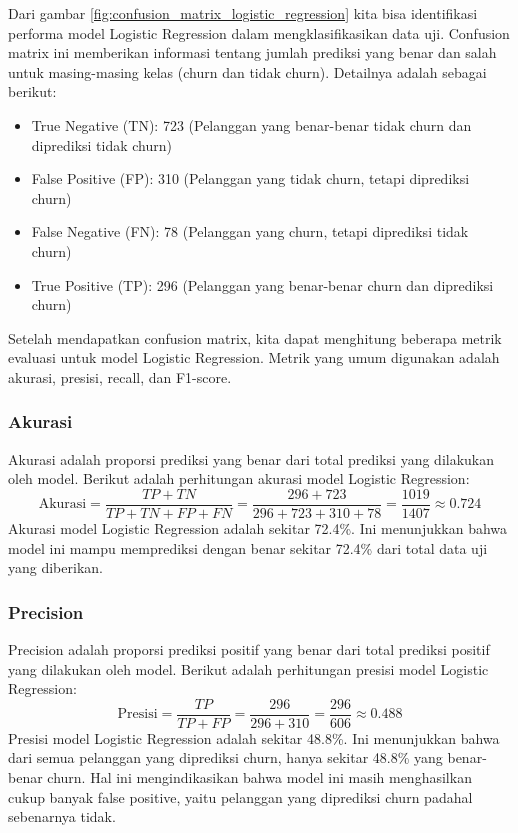 Dari gambar \ref{fig:confusion_matrix_logistic_regression} kita bisa identifikasi performa model Logistic Regression dalam mengklasifikasikan data uji. Confusion matrix ini memberikan informasi tentang jumlah prediksi yang benar dan salah untuk masing-masing kelas (churn dan tidak churn). Detailnya adalah sebagai berikut:

\begin{itemize}
    \item True Negative (TN): 723 (Pelanggan yang benar-benar tidak churn dan diprediksi tidak churn)
    \item False Positive (FP): 310 (Pelanggan yang tidak churn, tetapi diprediksi churn)
    \item False Negative (FN): 78 (Pelanggan yang churn, tetapi diprediksi tidak churn)
    \item True Positive (TP): 296 (Pelanggan yang benar-benar churn dan diprediksi churn)
\end{itemize}

Setelah mendapatkan confusion matrix, kita dapat menghitung beberapa metrik evaluasi untuk model Logistic Regression. Metrik yang umum digunakan adalah akurasi, presisi, recall, dan F1-score. 

\subsubsection*{Akurasi}

Akurasi adalah proporsi prediksi yang benar dari total prediksi yang dilakukan oleh model. Berikut adalah perhitungan akurasi model Logistic Regression:
\begin{equation}
    \text{Akurasi} = \frac{TP + TN}{TP + TN + FP + FN} = \frac{296 + 723}{296 + 723 + 310 + 78} = \frac{1019}{1407} \approx 0.724
\end{equation}
Akurasi model Logistic Regression adalah sekitar 72.4\%. Ini menunjukkan bahwa model ini mampu memprediksi dengan benar sekitar 72.4\% dari total data uji yang diberikan.

\subsubsection*{Precision}

Precision adalah proporsi prediksi positif yang benar dari total prediksi positif yang dilakukan oleh model. Berikut adalah perhitungan presisi model Logistic Regression:
\begin{equation}
    \text{Presisi} = \frac{TP}{TP + FP} = \frac{296}{296 + 310} = \frac{296}{606} \approx 0.488
\end{equation}
Presisi model Logistic Regression adalah sekitar 48.8\%. Ini menunjukkan bahwa dari semua pelanggan yang diprediksi churn, hanya sekitar 48.8\% yang benar-benar churn. Hal ini mengindikasikan bahwa model ini masih menghasilkan cukup banyak false positive, yaitu pelanggan yang diprediksi churn padahal sebenarnya tidak.



